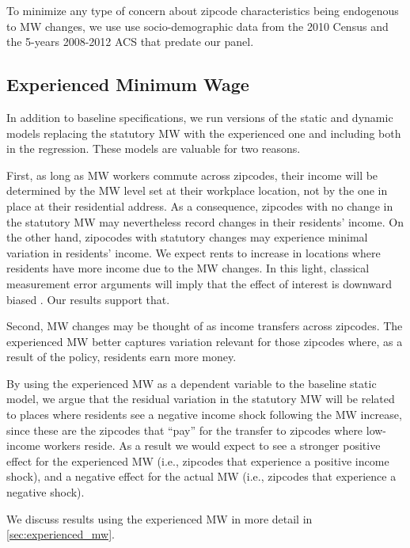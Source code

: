 To minimize any type of concern about zipcode characteristics being endogenous to MW changes, 
we use use socio-demographic data from the 2010 Census and the 5-years 2008-2012 ACS that 
predate our panel.


\subsection{Experienced Minimum Wage}\label{sec:emp_strategy_expmw}

In addition to baseline specifications, we run versions of the static and dynamic models 
replacing the statutory MW with the experienced one and including both in 
the regression. These models are valuable for two reasons.

First, as long as MW workers commute across zipcodes, their income will be determined by the 
MW level set at their workplace location, not by the one in place at their residential address.
As a consequence, zipcodes with no change in 
the statutory MW may nevertheless record changes in their residents' income. On the other hand, 
zipocodes with statutory changes may experience minimal variation in residents' income. 
We expect rents to increase in locations where residents have more income due to the MW 
changes. In this light, classical measurement error arguments will imply that the effect of interest 
is downward biased \parencite{AngristPischke2009}. Our results support that.  

Second, MW changes may be thought of as income transfers across zipcodes. 
The experienced MW better captures variation relevant for those zipcodes 
where, as a result of the policy, residents earn more money. 

By using the experienced MW as a dependent variable to the baseline static model, 
we argue that the residual variation in the statutory MW will be related to places where 
residents see a negative income shock following the MW increase, since these are the 
zipcodes that ``pay'' for the transfer to zipcodes where low-income workers reside. 
As a result we would expect to see a stronger positive effect for the experienced MW 
(i.e., zipcodes that experience a positive income shock), and a negative effect for 
the actual MW (i.e., zipcodes that experience a negative shock).

We discuss results using the experienced MW in more detail in \autoref{sec:experienced_mw}.



